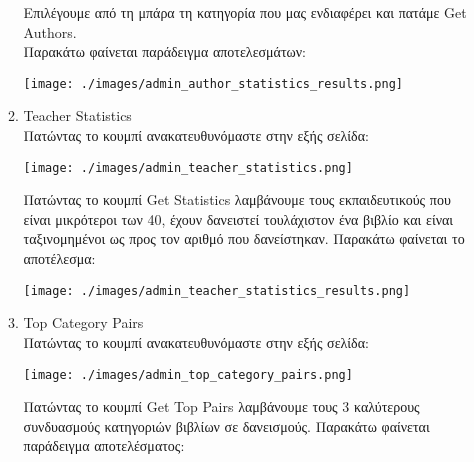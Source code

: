 \documentclass[14pt]{report}
\begin{document}
\begin{enumerate}
\begin{enumerate}
			Επιλέγουμε από τη μπάρα τη κατηγορία που μας ενδιαφέρει και πατάμε Get Authors. \\
			Παρακάτω φαίνεται παράδειγμα αποτελεσμάτων: \\
			
			\vspace{\baselineskip}
			
			\texttt{[image: ./images/admin\_author\_statistics\_results.png]}
			
			\vspace{\baselineskip}
			
			\newpage
			\hypertarget{a-teacher-stats}{}
			\item Teacher Statistics \\
			Πατώντας το κουμπί ανακατευθυνόμαστε στην εξής σελίδα: \\
			
			\vspace{\baselineskip}
			
			\texttt{[image: ./images/admin\_teacher\_statistics.png]}
			
			\vspace{\baselineskip}
			
			Πατώντας το κουμπί Get Statistics λαμβάνουμε τους εκπαιδευτικούς που είναι μικρότεροι των 40, έχουν δανειστεί τουλάχιστον ένα βιβλίο και είναι ταξινομημένοι ως προς τον αριθμό που δανείστηκαν. Παρακάτω φαίνεται το αποτέλεσμα: \\
			
			\vspace{\baselineskip}
			
			\texttt{[image: ./images/admin\_teacher\_statistics\_results.png]}
			
			\vspace{\baselineskip}
			
			\newpage
			\hypertarget{a-top-category-pairs}{}
			\item Top Category Pairs \\
			Πατώντας το κουμπί ανακατευθυνόμαστε στην εξής σελίδα: \\
			
			\vspace{\baselineskip}
			
			\texttt{[image: ./images/admin\_top\_category\_pairs.png]}
			
			\vspace{\baselineskip}
			
			Πατώντας το κουμπί Get Top Pairs λαμβάνουμε τους 3 καλύτερους συνδυασμούς κατηγοριών βιβλίων σε δανεισμούς. Παρακάτω φαίνεται παράδειγμα αποτελέσματος: \\
			

\end{enumerate}
\end{enumerate}
\end{document}
